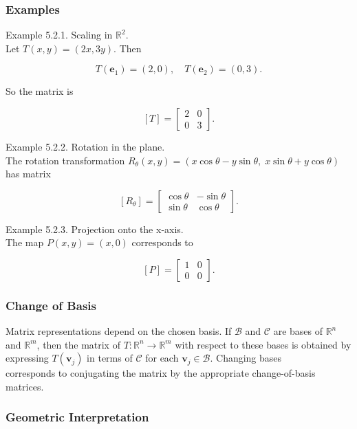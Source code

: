 \documentclass[
  12pt,
  a4paper,
]{article}
\begin{document}
\subsubsection{Examples}\label{examples-5}

Example 5.2.1. Scaling in \(\mathbb{R}^2\).\\
Let \(T(x,y) = (2x, 3y)\). Then

\[T(\mathbf{e}_1) = (2,0), \quad T(\mathbf{e}_2) = (0,3).\]

So the matrix is

\[[T] = \begin{bmatrix}
2 & 0 \\
0 & 3
\end{bmatrix}.\]

Example 5.2.2. Rotation in the plane.\\
The rotation transformation
\(R_\theta(x,y) = (x\cos\theta - y\sin\theta, \; x\sin\theta + y\cos\theta)\)
has matrix

\[[R_\theta] = \begin{bmatrix}
\cos\theta & -\sin\theta \\
\sin\theta & \cos\theta
\end{bmatrix}.\]

Example 5.2.3. Projection onto the x-axis.\\
The map \(P(x,y) = (x,0)\) corresponds to

\[[P] = \begin{bmatrix}
1 & 0 \\
0 & 0
\end{bmatrix}.\]

\subsubsection{Change of Basis}\label{change-of-basis-2}

Matrix representations depend on the chosen basis. If \(\mathcal{B}\)
and \(\mathcal{C}\) are bases of \(\mathbb{R}^n\)\\
and \(\mathbb{R}^m\), then the matrix of
\(T: \mathbb{R}^n \to \mathbb{R}^m\) with respect to these bases is
obtained by\\
expressing \(T(\mathbf{v}_j)\) in terms of \(\mathcal{C}\) for each
\(\mathbf{v}_j \in \mathcal{B}\). Changing bases\\
corresponds to conjugating the matrix by the appropriate change-of-basis
matrices.

\subsubsection{Geometric
Interpretation}\label{geometric-interpretation-9}
\end{document}
